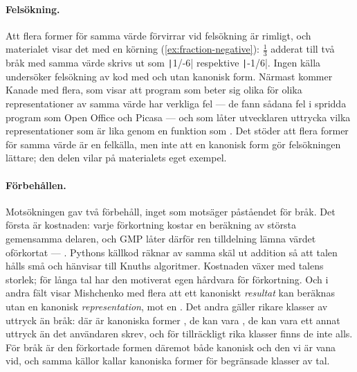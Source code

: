 \paragraph{Felsökning.}  Att flera former för samma värde förvirrar vid
felsökning är rimligt, och materialet visar det med en körning
(\cref{ex:fraction-negative}): \(\frac{1}{3}\) adderat till två bråk med
samma värde skrivs ut som \texttt|1/-6| respektive
\texttt|-1/6|.  Ingen källa undersöker felsökning av kod med och
utan kanonisk form.  Närmast kommer Kanade med flera, som visar att
program som beter sig olika för olika representationer av samma värde
har verkliga fel --- de fann sådana fel i spridda program som Open
Office och Picasa --- och som låter utvecklaren uttrycka vilka
representationer som är lika genom en funktion som
.  Det stöder att flera former för samma värde är en
felkälla, men inte att en kanonisk form gör felsökningen lättare; den
delen vilar på materialets eget exempel.

\paragraph{Förbehållen.}  Motsökningen gav två förbehåll, inget som
motsäger påståendet för bråk.  Det första är kostnaden: varje
förkortning kostar en beräkning av största gemensamma delaren, och GMP
låter därför ren tilldelning lämna värdet oförkortat --- .  Pythons
källkod räknar av samma skäl ut addition så att talen hålls små och
hänvisar till Knuths algoritmer\autocite{CPythonFractionsSource}.  Kostnaden
växer med talens storlek; för långa tal har den motiverat egen
hårdvara för förkortning\autocite{Jebelean1993Systolic}.  Och i andra
fält visar Mishchenko med flera att ett kanoniskt \emph{resultat} kan
beräknas utan en kanonisk \emph{representation}, mot en
.  Det
andra gäller rikare klasser av uttryck än bråk: där är kanoniska former
, de
kan vara , de kan vara ett annat
uttryck än det användaren skrev\autocite{Fateman1979Simplifier}, och för
tillräckligt rika klasser finns de inte alls\autocite{Caviness1970}.  För
bråk är den förkortade formen däremot både kanonisk och den vi är vana
vid, och samma källor kallar kanoniska former
 för begränsade
klasser av tal.

